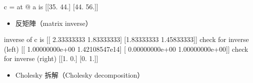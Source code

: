 \documentclass[letterpaper,10pt,english]{sphinxmanual}
\begin{document}
\begin{sphinxVerbatim}[commandchars=\\\{\}]
    
\end{sphinxVerbatim}

\begin{sphinxVerbatim}[commandchars=\\\{\}]
c = a\PYGZus{}t @ a is 
 [[35. 44.]
 [44. 56.]]
\end{sphinxVerbatim}
\begin{itemize}
\item {} 
反矩陣（matrix inverse）

\end{itemize}

\begin{sphinxVerbatim}[commandchars=\\\{\}]
    
       
        
        
\end{sphinxVerbatim}

\begin{sphinxVerbatim}[commandchars=\\\{\}]
inverse of c is 
 [[ 2.33333333 \PYGZhy{}1.83333333]
 [\PYGZhy{}1.83333333  1.45833333]]
check for inverse (left) 
 [[ 1.00000000e+00 \PYGZhy{}1.42108547e\PYGZhy{}14]
 [ 0.00000000e+00  1.00000000e+00]]
check for inverse (right) 
 [[1. 0.]
 [0. 1.]]
\end{sphinxVerbatim}
\begin{itemize}
\item {} 
Cholesky 拆解（Cholesky decomposition）

\end{itemize}
\end{document}
